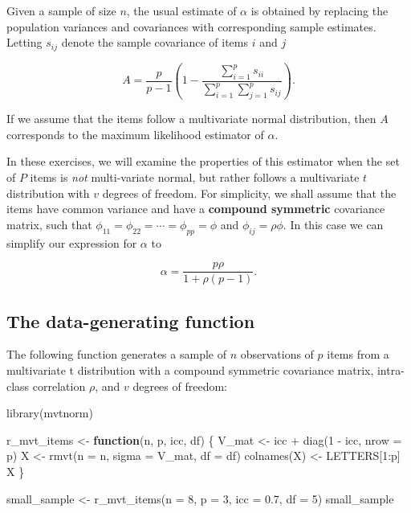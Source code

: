 \documentclass[
]{book}
\newenvironment{Shaded}{\begin{snugshade}}{\end{snugshade}}
\newcommand{\AttributeTok}[1]{\textcolor[rgb]{0.77,0.63,0.00}{#1}}
\newcommand{\ControlFlowTok}[1]{\textcolor[rgb]{0.13,0.29,0.53}{\textbf{#1}}}
\newcommand{\DecValTok}[1]{\textcolor[rgb]{0.00,0.00,0.81}{#1}}
\newcommand{\FloatTok}[1]{\textcolor[rgb]{0.00,0.00,0.81}{#1}}
\newcommand{\FunctionTok}[1]{\textcolor[rgb]{0.00,0.00,0.00}{#1}}
\newcommand{\NormalTok}[1]{#1}
\newcommand{\OtherTok}[1]{\textcolor[rgb]{0.56,0.35,0.01}{#1}}
\newcommand{\SpecialCharTok}[1]{\textcolor[rgb]{0.00,0.00,0.00}{#1}}
\begin{document}
Given a sample of size \(n\), the usual estimate of \(\alpha\) is obtained by replacing the population variances and covariances with corresponding sample estimates. Letting \(s_{ij}\) denote the sample covariance of items \(i\) and \(j\)

\[
A = \frac{p}{p - 1}\left(1 - \frac{\sum_{i=1}^p s_{ii}}{\sum_{i=1}^p \sum_{j=1}^p s_{ij}}\right).
\]

If we assume that the items follow a multivariate normal distribution, then \(A\) corresponds to the maximum likelihood estimator of \(\alpha\).

In these exercises, we will examine the properties of this estimator when the set of \(P\) items is \emph{not} multi-variate normal, but rather follows a multivariate \(t\) distribution with \(v\) degrees of freedom. For simplicity, we shall assume that the items have common variance and have a \textbf{compound symmetric} covariance matrix, such that \(\phi_{11} = \phi_{22} = \cdots = \phi_{pp} = \phi\) and \(\phi_{ij} = \rho \phi\). In this case we can simplify our expression for \(\alpha\) to

\[
\alpha = \frac{p \rho}{1 + \rho (p - 1)}.
\]

\hypertarget{the-data-generating-function}{%
\subsection{The data-generating function}\label{the-data-generating-function}}

The following function generates a sample of \(n\) observations of \(p\) items from a multivariate t distribution with a compound symmetric covariance matrix, intra-class correlation \(\rho\), and \(v\) degrees of freedom:

\begin{Shaded}
\begin{Highlighting}[]
\FunctionTok{library}\NormalTok{(mvtnorm)}

\NormalTok{r\_mvt\_items }\OtherTok{\textless{}{-}} \ControlFlowTok{function}\NormalTok{(n, p, icc, df) \{}
\NormalTok{  V\_mat }\OtherTok{\textless{}{-}}\NormalTok{ icc }\SpecialCharTok{+} \FunctionTok{diag}\NormalTok{(}\DecValTok{1} \SpecialCharTok{{-}}\NormalTok{ icc, }\AttributeTok{nrow =}\NormalTok{ p)}
\NormalTok{  X }\OtherTok{\textless{}{-}} \FunctionTok{rmvt}\NormalTok{(}\AttributeTok{n =}\NormalTok{ n, }\AttributeTok{sigma =}\NormalTok{ V\_mat, }\AttributeTok{df =}\NormalTok{ df)}
  \FunctionTok{colnames}\NormalTok{(X) }\OtherTok{\textless{}{-}}\NormalTok{ LETTERS[}\DecValTok{1}\SpecialCharTok{:}\NormalTok{p]}
\NormalTok{  X}
\NormalTok{\}}

\NormalTok{small\_sample }\OtherTok{\textless{}{-}} \FunctionTok{r\_mvt\_items}\NormalTok{(}\AttributeTok{n =} \DecValTok{8}\NormalTok{, }\AttributeTok{p =} \DecValTok{3}\NormalTok{, }\AttributeTok{icc =} \FloatTok{0.7}\NormalTok{, }\AttributeTok{df =} \DecValTok{5}\NormalTok{)}
\NormalTok{small\_sample}
\end{Highlighting}
\end{Shaded}
\end{document}

